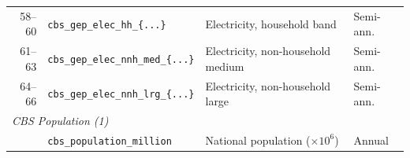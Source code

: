 \begin{table}[htbp]
\begin{tabularx}{\columnwidth}{r l X l}
58--60 & \texttt{cbs\_gep\_elec\_hh\_\{...\}}      & Electricity, household band & Semi-ann. \\
61--63 & \texttt{cbs\_gep\_elec\_nnh\_med\_\{...\}} & Electricity, non-household medium & Semi-ann. \\
64--66 & \texttt{cbs\_gep\_elec\_nnh\_lrg\_\{...\}} & Electricity, non-household large & Semi-ann. \\
\midrule
\multicolumn{4}{l}{\textit{CBS Population (1)}} \\
\addlinespace[2pt]
67 & \texttt{cbs\_population\_million} & National population ($\times 10^6$) & Annual \\
\bottomrule
\end{tabularx}
\end{table}

\clearpage
